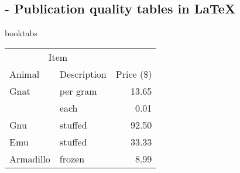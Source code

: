 
\subsection{ - Publication quality tables in LaTeX}

\begin{demo}{}{booktabs}
  \begin{tabular}{@{}llr@{}} \toprule
    \multicolumn{2}{c}{Item}              \\ \cmidrule(r){1-2}
    Animal    & Description  & Price (\$) \\ \midrule
    Gnat      & per gram     & 13.65      \\
              & each         & 0.01       \\
    Gnu       & stuffed      & 92.50      \\
    Emu       & stuffed      & 33.33      \\
    Armadillo & frozen       & 8.99       \\ \bottomrule
  \end{tabular}
\end{demo}
